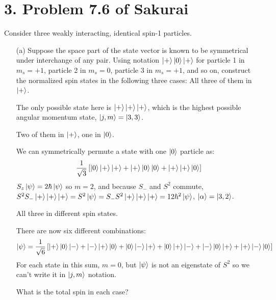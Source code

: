 \documentclass[a4paper,twoside]{article}
\begin{document}
\section*{3. Problem 7.6 of Sakurai}
Consider three weakly interacting, identical spin-1 particles.
\begin{itemize}
    \item[(a)] Suppose the space part of the state vector is known to be symmetrical under interchange of any pair. Using notation $\ket{+}\ket{0}\ket{+} $ for particle 1 in $ m_s = +1 $, particle 2 in $ m_s = 0 $, particle 3 in $ m_s = +1 $, and so on, construct the normalized spin states in the following three cases:
        \subitem[(i)] All three of them in $\ket{+} $.
        \begin{problem}
            The only possible state here is $\ket{+}\ket{+}\ket{+} $, which is the highest possible angular momentum state, $\ket{j,m} =\ket{3,3} $.
        \end{problem}
        \subitem[(ii)] Two of them in $\ket{+} $, one in $\ket{0} $.
        \begin{problem}
            We can symmetrically permute a state with one $\ket{0} $ particle as:
            \begin{equation}
                \frac{1}{\sqrt{3}} \left[\ket{0}\ket{+}\ket{+} +\ket{+}\ket{0}\ket{0} +\ket{+}\ket{+}\ket{0} \right]
            \end{equation}
            $ S_z\ket{\psi} = 2 \hbar\ket{\psi} $ so $ m = 2 $, and because $ S_- $ and $ S^2 $ commute, $ S^2 S_-\ket{+}\ket{+}\ket{+} = S^2\ket{\psi} = S_- S^2\ket{+}\ket{+}\ket{+} = 12 \hbar^2\ket{\psi}$, $\ket{\alpha} =\ket{3,2} $.
        \end{problem}
        \subitem[(iii)] All three in different spin states.
        \begin{problem}
            There are now six different combinations:
            \begin{equation}
                \ket{\psi} = \frac{1}{\sqrt{6}} \left[\ket{+}\ket{0}\ket{-} +\ket{-}\ket{+}\ket{0} +\ket{0}\ket{-}\ket{+} +\ket{0}\ket{+}\ket{-} +\ket{-}\ket{0}\ket{+} +\ket{+}\ket{-}\ket{0} \right]
            \end{equation}
            For each state in this sum, $ m = 0 $, but $\ket{\psi} $ is not an eigenstate of $ S^2 $ so we can't write it in $\ket{j,m} $ notation.
        \end{problem}
        What is the total spin in each case?
        \begin{problem}

\end{problem}
\end{itemize}
\end{document}
